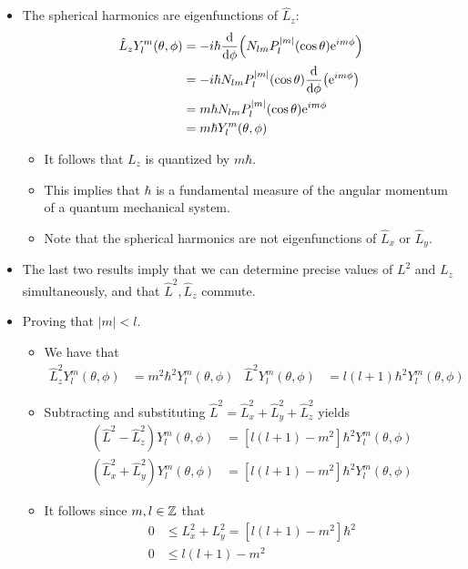 \documentclass[../notes.tex]{subfiles}
\begin{document}
\begin{itemize}
\begin{itemize}
    \end{itemize}
    \item The spherical harmonics are eigenfunctions of $\hat{L}_z$:
    \begin{align*}
        \hat{L}_zY_l^m(\theta,\phi) &= -i\hbar\dv{\phi}(N_{lm}P_l^{|m|}(\cos\theta)\e[im\phi])\\
        &= -i\hbar N_{lm}P_l^{|m|}(\cos\theta)\dv{\phi}(\e[im\phi])\\
        &= m\hbar N_{lm}P_l^{|m|}(\cos\theta)\e[im\phi]\\
        &= m\hbar Y_l^m(\theta,\phi)
    \end{align*}
    \begin{itemize}
        \item It follows that $L_z$ is quantized by $m\hbar$.
        \item This implies that $\hbar$ is a fundamental measure of the angular momentum of a quantum mechanical system.
        \item Note that the spherical harmonics are not eigenfunctions of $\hat{L}_x$ or $\hat{L}_y$.
    \end{itemize}
    \item The last two results imply that we can determine precise values of $L^2$ and $L_z$ simultaneously, and that $\hat{L}^2,\hat{L}_z$ commute.
    \item Proving that $|m|<l$.
    \begin{itemize}
        \item We have that
        \begin{align*}
            \hat{L}_z^2Y_l^m(\theta,\phi) &= m^2\hbar^2Y_l^m(\theta,\phi)&
            \hat{L}^2Y_l^m(\theta,\phi) &= l(l+1)\hbar^2Y_l^m(\theta,\phi)
        \end{align*}
        \item Subtracting and substituting $\hat{L}^2=\hat{L}_x^2+\hat{L}_y^2+\hat{L}_z^2$ yields
        \begin{align*}
            (\hat{L}^2-\hat{L}_z^2)Y_l^m(\theta,\phi) &= [l(l+1)-m^2]\hbar^2Y_l^m(\theta,\phi)\\
            (\hat{L}_x^2+\hat{L}_y^2)Y_l^m(\theta,\phi) &= [l(l+1)-m^2]\hbar^2Y_l^m(\theta,\phi)
        \end{align*}
        \item It follows since $m,l\in\Z$ that
        \begin{align*}
            0 &\leq L_x^2+L_y^2 = [l(l+1)-m^2]\hbar^2\\
            0 &\leq l(l+1)-m^2\\

\end{align*}
\end{itemize}
\end{itemize}
\end{document}
